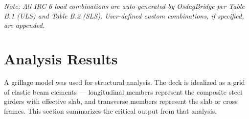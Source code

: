 \documentclass[12pt,a4paper]{report}
\numberwithin{table}{chapter}
\numberwithin{figure}{chapter}
\renewcommand{\arraystretch}{1.15}
\begin{document}
\noindent\textit{Note: All IRC 6 load combinations are auto-generated by OsdagBridge per Table B.1 (ULS) and Table B.2 (SLS). User-defined custom combinations, if specified, are appended.}


\chapter{Analysis Results}

A grillage model was used for structural analysis. The deck is idealized as a grid of elastic beam elements --- longitudinal members represent the composite steel girders with effective slab, and transverse members represent the slab or cross frames. This section summarizes the critical output from that analysis.

\vspace{1em}
\begingroup
\footnotesize
\setlength{\tabcolsep}{3pt}
\renewcommand{\arraystretch}{1.25}
\end{document}
